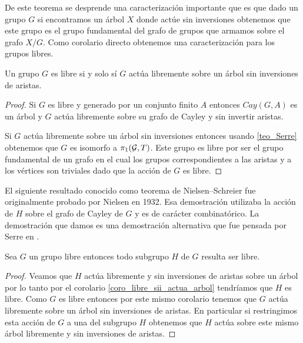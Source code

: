 \documentclass[tesis.tex]{subfiles}
\begin{document}
De este teorema se desprende una caracterización importante que es que dado un grupo $G$ si encontramos un árbol $X$ donde actúe sin inversiones obtenemos que este grupo es el grupo fundamental del grafo de grupos que armamos sobre el grafo $X/G$.
Como corolario directo obtenemos una caracterización para los grupos libres.




\begin{coro}\label{coro_libre_sii_actua_arbol}
	Un grupo $G$ es libre si y solo sí $G$ actúa libremente sobre un árbol sin inversiones de aristas. 
\end{coro}

\begin{proof}
	Si $G$ es libre  y generado por un conjunto finito $A$ entonces $Cay(G,A)$ es un árbol y $G$ actúa libremente sobre su grafo de Cayley y sin invertir aristas.
	
	Si $G$ actúa libremente sobre un árbol sin inversiones entonces usando \ref{teo_Serre} obtenemos que $G$ es isomorfo a $\pi_1({\cal G}, T)$.
	Este grupo es libre por ser el grupo fundamental de un grafo en el cual los grupos correspondientes a las aristas y a los vértices son triviales dado que la acción de $G$ es libre.
	
\end{proof}

El siguiente resultado conocido como teorema de Nielsen--Schreier fue originalmente probado por Nielsen en 1932.
Esa demostración utilizaba la acción de $H$ sobre el grafo de Cayley de $G$ y es de carácter combinatórico. 
La demostración que damos es una demostración alternativa que fue pensada por Serre en \cite{serre2002trees}.

\begin{coro}\label{coro_niels_sch}
	Sea $G$ un grupo libre entonces todo subgrupo $H$ de $G$ resulta ser libre.
\end{coro}
\begin{proof} 
	Veamos que $H$ actúa libremente y sin inversiones de aristas sobre un árbol por lo tanto por el corolario \ref{coro_libre_sii_actua_arbol} tendríamos que $H$ es libre.
	Como $G$ es libre entonces por este mismo corolario tenemos que $G$ actúa libremente sobre un árbol sin inversiones de aristas.
	En particular si restringimos esta acción de $G$ a una del subgrupo $H$ obtenemos que $H$ actúa sobre este mismo árbol libremente y sin inversiones de aristas. 
	
\end{proof}
\end{document}
